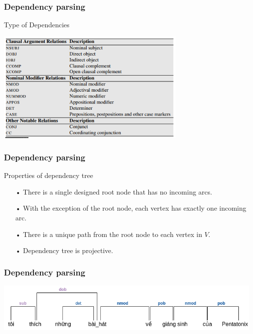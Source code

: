 \documentclass{beamer}
\begin{document}
\begin{frame}
	\frametitle{Dependency parsing}
	
	Type of Dependencies
	\begin{center} 
		\centering 
			\includegraphics[width=0.7\textwidth,height=0.7\textheight,keepaspectratio]{dptypes} 			
			\vspace{0.5cm} 
	\end{center}	
		
\end{frame}

\begin{frame}
	\frametitle{Dependency parsing}
	
	Properties of dependency tree
	\begin{itemize}
		
		\item[•] There is a single designed root node that has no incoming arcs.
		\item[•] With the exception of the root node, each vertex has exactly one incoming arc.
		\item[•] There is a unique path from the root node to each vertex in $V$.
		\item[•] Dependency tree is projective.		
		
	\end{itemize}		
		
\end{frame}

\begin{frame}
	\frametitle{Dependency parsing}
			
	\begin{center} 
		\centering 
			\includegraphics[width=\textwidth,height=\textheight,keepaspectratio]{qa_first_ex} 			
			\vspace{0.5cm} 
	\end{center}		
		
\end{frame}
\end{document}
